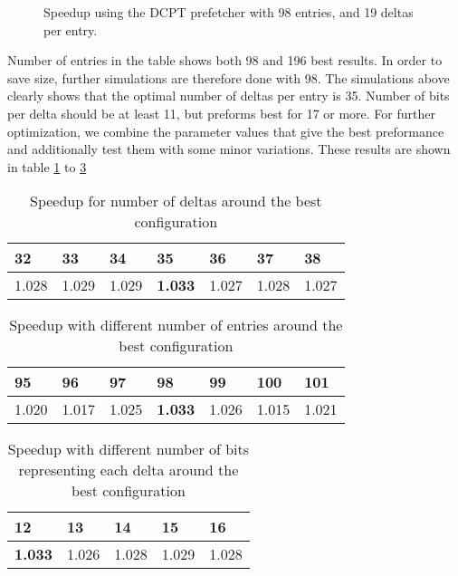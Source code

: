 \begin{figure}[h]
    \begin{centering}
        
        \caption{Speedup using the DCPT prefetcher with 98 entries, and 19 deltas per entry.}
        \label{figure:dcpt-delta-bits}
    \end{centering}
\end{figure}
Number of entries in the table shows both 98 and 196 best results. In order to save size, further simulations are therefore done with 98. The simulations above clearly shows that the optimal number of deltas per entry is 35. 
Number of bits per delta should be at least 11, but preforms best for 17 or more. 
For further optimization, we combine the parameter values that give the best preformance and additionally test them with some minor variations. These results are shown in table \ref{tab:numdelta} to \ref{tab:deltabits}


\begin{table}[h]
\centering
\label{tab:numdelta}
\begin{tabular}{|l|l|l|l|l|l|l|}
\hline
32    & 33    & 34    & \textbf{35}    & 36    & 37    & 38    \\ \hline
1.028 & 1.029 & 1.029 & \textbf{1.033} & 1.027 & 1.028 & 1.027 \\ \hline
\end{tabular}
\smallskip
\caption{Speedup for number of deltas around the best configuration}
\end{table}


\begin{table}[h]
\centering
\label{tab:tablesize}
\begin{tabular}{|l|l|l|l|l|l|l|}
\hline
95    & 96    & 97    & \textbf{98}    & 99    & 100   & 101   \\ \hline
1.020 & 1.017 & 1.025 & \textbf{1.033} & 1.026 & 1.015 & 1.021 \\ \hline
\end{tabular}
\smallskip
\caption{Speedup with different number of entries around the best configuration}
\end{table}


\begin{table}[h]
\centering
\label{tab:deltabits}
\begin{tabular}{|l|l|l|l|l|}
\hline
\textbf{12}    & 13    & 14    & 15    & 16    \\ \hline
\textbf{1.033} & 1.026 & 1.028 & 1.029 & 1.028 \\ \hline
\end{tabular}
\smallskip
\caption{Speedup with different number of bits representing each delta around the best configuration}
\end{table}


